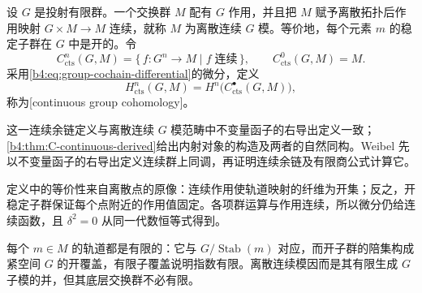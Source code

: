 \begin{definition}\label{b4:def:continuous-group-cochains}
	设 \(G\) 是投射有限群。一个交换群 \(M\) 配有 \(G\) 作用，并且把 \(M\) 赋予离散拓扑后作用映射 \(G\times M\to M\) 连续，就称 \(M\) 为离散连续 \(G\) 模。等价地，每个元素 \(m\) 的稳定子群在 \(G\) 中是开的。令
	\[
		C_{\mathrm{cts}}^n(G,M)=\{\,f:G^n\to M\mid f\;\text{连续}\,\}, \qquad C_{\mathrm{cts}}^0(G,M)=M.
	\]
	采用\eqref{b4:eq:group-cochain-differential}的微分，定义
	\[
		H_{\mathrm{cts}}^n(G,M)=H^n\bigl(C_{\mathrm{cts}}^\bullet(G,M)\bigr),
	\]
	称为[continuous group cohomology]。
\end{definition}

这一连续余链定义与离散连续 \(G\) 模范畴中不变量函子的右导出定义一致；\cref{b4:thm:C-continuous-derived}给出内射对象的构造及两者的自然同构。Weibel 先以不变量函子的右导出定义连续群上同调，再证明连续余链及有限商公式计算它\cite[Profinite Cohomology 6.11.11, Theorem 6.11.13]{Weibel1994HomologicalAlgebra}。

\ProseParagraphBreak
定义中的等价性来自离散点的原像：连续作用使轨道映射的纤维为开集；反之，开稳定子群保证每个点附近的作用值固定。各项群运算与作用连续，所以微分仍给连续函数，且 \(\delta^2=0\) 从同一代数恒等式得到。

\ProseParagraphBreak
每个 \(m\in M\) 的轨道都是有限的：它与 \(G/\operatorname{Stab}(m)\) 对应，而开子群的陪集构成紧空间 \(G\) 的开覆盖，有限子覆盖说明指数有限。离散连续模因而是其有限生成 \(G\) 子模的并，但其底层交换群不必有限。

